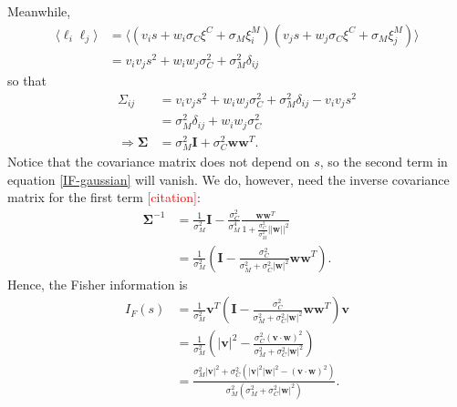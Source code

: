 \documentclass[11pt]{article}
\begin{document}
	Meanwhile,
	\begin{align}
		\langle \ell_i \ell_j \rangle &= \langle (v_i s + w_i \sigma_C\xi^C + \sigma_M\xi_i^M) (v_j s + w_j \sigma_C\xi^C + \sigma_M\xi_j^M)\rangle \\
		&= v_i v_j s^2 + w_i w_j \sigma_C^2 + \sigma_M^2 \delta_{ij}
	\end{align}
	so that
	\begin{align}
		\Sigma_{ij} &= v_i v_j s^2 + w_i w_j \sigma_C^2 + \sigma_M^2 \delta_{ij} - v_i v_j s^2 \\
		&= \sigma_M^2 \delta_{ij} + w_i w_j \sigma_C^2 \\
		\Rightarrow \boldsymbol{\Sigma} &= \sigma_M^2 \mathbf{I} + \sigma_C^2\mathbf{ww}^T.
	\end{align}
	Notice that the covariance matrix does not depend on $s$, so the second term in equation \eqref{IF-gaussian} will vanish. We do, however, need the inverse covariance matrix for the first term \textcolor{red}{[citation]}:
	\begin{align}
		\boldsymbol{\Sigma}^{-1} &= \frac{1}{\sigma_M^2} \mathbf{I} - \frac{\sigma_C^2}{\sigma_M^4} \frac{\mathbf{ww}^T}{1+\frac{\sigma_C^2}{\sigma_M^2}||\mathbf{w}||^2}\\
		&= \frac{1}{\sigma_M^2}\left(\mathbf{I} - \frac{\sigma_C^2}{\sigma_M^2 + \sigma_C^2 |\mathbf{w}|^2}\mathbf{ww}^T\right).
	\end{align}
	Hence, the Fisher information is
	\begin{align}
		I_{F}(s) &= \frac{1}{\sigma_M^2}\mathbf{v}^T \left(\mathbf{I} - \frac{\sigma_C^2}{\sigma_M^2 + \sigma_C^2 |\mathbf{w}|^2}\mathbf{ww}^T\right) \mathbf{v} \\
		&= \frac{1}{\sigma_M^2} \left(|\mathbf{v}|^2 - \frac{\sigma_C^2 (\mathbf{v}\cdot\mathbf{w})^2}{\sigma_M^2 + \sigma_C^2 |\mathbf{w}|^2}\right) \\
		&= \frac{\sigma_M^2 |\mathbf{v}|^2 + \sigma_C^2 \left(|\mathbf{v}|^2|\mathbf{w}|^2 - (\mathbf{v}\cdot\mathbf{w})^2\right)}{\sigma_M^2 (\sigma_M^2 + \sigma_C^2 |\mathbf{w}|^2)}.
	\end{align}
	\newpage
\end{document}
